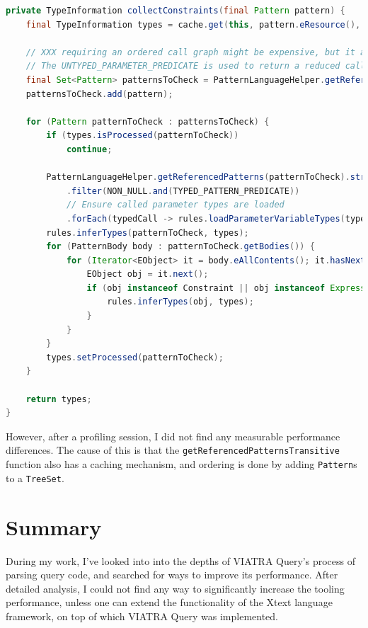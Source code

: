 \documentclass[11pt,a4paper,oneside]{report}
\begin{document}
\begin{lstlisting}[caption={Modified source code of \texttt{collectConstraints}}, language=java]
private TypeInformation collectConstraints(final Pattern pattern) {
    final TypeInformation types = cache.get(this, pattern.eResource(), () -> new TypeInformation(typeSystem));

    // XXX requiring an ordered call graph might be expensive, but it avoids inconsistent errors during type inference
    // The UNTYPED_PARAMETER_PREDICATE is used to return a reduced call graph where pattern with only declared types are (transitively) ignored.
    final Set<Pattern> patternsToCheck = PatternLanguageHelper.getReferencedPatternsTransitive(pattern, true, NON_NULL.and(UNTYPED_PATTERN_PREDICATE));
    patternsToCheck.add(pattern);

    for (Pattern patternToCheck : patternsToCheck) {
        if (types.isProcessed(patternToCheck))
            continue;

        PatternLanguageHelper.getReferencedPatterns(patternToCheck).stream()
            .filter(NON_NULL.and(TYPED_PATTERN_PREDICATE))
            // Ensure called parameter types are loaded
            .forEach(typedCall -> rules.loadParameterVariableTypes(typedCall, types));
        rules.inferTypes(patternToCheck, types);
        for (PatternBody body : patternToCheck.getBodies()) {
            for (Iterator<EObject> it = body.eAllContents(); it.hasNext();) {
                EObject obj = it.next();
                if (obj instanceof Constraint || obj instanceof Expression) {
                    rules.inferTypes(obj, types);
                }
            }
        }
        types.setProcessed(patternToCheck);
    }

    return types;
}
\end{lstlisting}

However, after a profiling session, I did not find any measurable performance
differences. The cause of this is that the
\texttt{getReferencedPatternsTransitive} function also has a caching mechanism,
and ordering is done by adding \texttt{Pattern}s to a \texttt{TreeSet}.

\chapter{Summary}

During my work, I've looked into into the depths of VIATRA Query's process of
parsing query code, and searched for ways to improve its performance. After
detailed analysis, I could not find any way to significantly increase the
tooling performance, unless one can extend the functionality of the Xtext
language framework, on top of which VIATRA Query was implemented.
\end{document}
